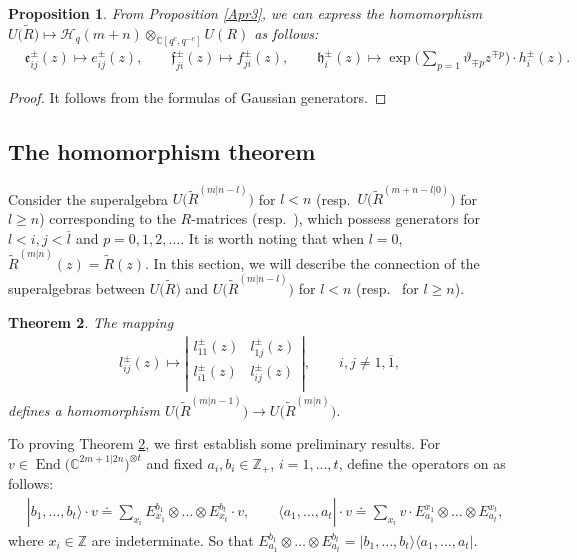 \documentclass[pdftex]{sigma}
\numberwithin{equation}{section}
\newtheorem{Theorem}{Theorem}[section]
\newtheorem{Proposition}[Theorem]{Proposition}
 { \theoremstyle{definition}
\newtheorem{Definition}[Theorem]{Definition}
\newtheorem{Note}[Theorem]{Note}
\newtheorem{Example}[Theorem]{Example}
\newtheorem{Remark}[Theorem]{Remark} }
\begin{document}
\begin{Proposition}\label{Apr4}
From Proposition {\rm\ref{Apr3}}, we can express the homomorphism $U\bigl(\widetilde{R}\bigr)\mapsto\mathcal{H}_q(m+n)\otimes_{\mathbb{C}[q^c, q^{-c}]} U(R)$ as follows:
\begin{align*}
 & \mathfrak{e}_{ij}^{\pm}(z)\mapsto e_{ij}^{\pm}(z),\qquad \mathfrak{f}_{ji}^{\pm}(z)\mapsto f_{ji}^{\pm}(z),\qquad
 \mathfrak{h}_i^{\pm}(z)\mapsto \exp\biggl(\sum_{p=1}\vartheta_{\mp p}z^{\mp p}\biggr) \cdot h_i^{\pm}(z).
 \end{align*}
\end{Proposition}
\begin{proof}
It follows from the formulas of Gaussian generators.
\end{proof}




\subsection{The homomorphism theorem }
Consider the superalgebra $U\bigl(\widetilde{R}^{(m|n-l)}\bigr)$ for $l<n$ (resp.\ $U\bigl(\widetilde{R}^{(m+n-l|0)}\bigr)$ for $l\geq n$) corresponding to the $R$-matrices  (resp.\ ), which possess generators  for $l<i,j <\overline{l}$ and $p=0,1,2,\dots$.
It is worth noting that when $l=0$, $\widetilde{R}^{(m|n)}(z)=\widetilde{R}(z)$. In this section, we will describe the connection of the superalgebras between $U\bigl(\widetilde{R}\bigr)$ and $U\bigl(\widetilde{R}^{(m|n-l)}\bigr)$ for $l<n$ (resp.\  for $l\geq n$).

\begin{Theorem}\label{th1}
The mapping
\begin{align*}
l_{ij}^{\pm}(z)\mapsto
\left|
 \begin{matrix}
 l_{11}^{\pm}(z) & l_{1j}^{\pm}(z) \\
 l_{i1}^{\pm}(z) &\boxed{l_{ij}^{\pm}(z)} \\
 \end{matrix}
 \right|, \qquad i,j \neq1,\overline{1},
\end{align*}
defines a homomorphism $U\bigl(\widetilde{R}^{(m|n-1)}\bigr)\rightarrow U\bigl(\widetilde{R}^{(m|n)}\bigr)$.
\end{Theorem}


To proving Theorem \ref{th1}, we first establish some preliminary results. For $v\in \operatorname{End}\bigl(\mathbb{C}^{2m+1|2n}\bigr)^{\otimes t}$ and fixed $a_i,b_i\in\mathbb{Z}_+$, $i=1,\dots,t$, define the operators on  as follows:
\begin{align*}
 &|b_1,\dots, b_t\rangle\cdot v\doteq \sum\limits_{x_i} E_{x_1}^{b_1}\otimes \dots\otimes E_{x_t}^{b_t}\cdot v ,\qquad \langle a_1,\dots, a_t| \cdot v\doteq \sum\limits_{x_i}v\cdot E^{x_1}_{a_1}\otimes \dots\otimes E^{x_t}_{a_t},
\end{align*}
where $x_i\in\mathbb{Z}$ are indeterminate. So that $E_{a_1}^{b_1}\otimes \dots\otimes E_{a_t}^{b_t}=|b_1,\dots, b_t\rangle \langle a_1,\dots, a_t|$.
\end{document}
